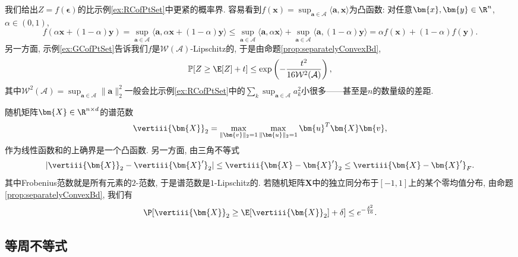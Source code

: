 \begin{example}[点集的Rademacher复杂度']
	我们给出$Z = f(\bm{\epsilon})$的比示例\ref{ex:RCofPtSet}中更紧的概率界. 
	容易看到$f(\bm{x}) = \sup_{\bm{a} \in \mathcal{A}} \langle \bm{a}, \bm{x} \rangle$为凸函数: 对任意$\bm{x}, \bm{y} \in \R^n$, $\alpha \in (0,1)$, 
	\begin{equation*}
		f(\alpha \bm{x} + (1-\alpha) \bm{y})
		= \sup_{\bm{a} \in \mathcal{A}} \langle \bm{a}, \alpha \bm{x} + (1-\alpha) \bm{y} \rangle
		\leq \sup_{\bm{a} \in \mathcal{A}} \langle \bm{a}, \alpha \bm{x} \rangle + \sup_{\bm{a} \in \mathcal{A}} \langle \bm{a}, (1-\alpha) \bm{y} \rangle
		= \alpha f(\bm{x}) + (1-\alpha) f(\bm{y}).  
	\end{equation*}
	另一方面, 示例\ref{ex:GCofPtSet}告诉我们$f$是$\mathcal{W}(\mathcal{A})$-Lipschitz的, 于是由命题\ref{prop:separatelyConvexBd}, 
	\begin{equation*}
		\mathbb{P}[Z \geq \E[Z] + t] \leq \exp \left( - \frac{t^2}{16\mathcal{W}^2(\mathcal{A})} \right), 
	\end{equation*}
	其中$\mathcal{W}^2(\mathcal{A}) = \sup_{\bm{a} \in \mathcal{A}}\|\bm{a}\|_2^2$一般会比示例\ref{ex:RCofPtSet}中的$\sum_k \sup_{\bm{a} \in \mathcal{A}} a_k^2$小很多——甚至是$n$的数量级的差距. 
\end{example}

\begin{example}[随机矩阵的谱范数]
	随机矩阵$\bm{X} \in \R^{n \times d}$的谱范数
	\begin{equation*}
		\vertiii{\bm{X}}_2 = \max_{\|\bm{v}\|_2 = 1} \max_{\|\bm{u}\|_2 = 1} \bm{u}^T \bm{X} \bm{v}, 
	\end{equation*}
	作为线性函数和的上确界是一个凸函数. 
	另一方面, 由三角不等式
	\begin{equation*}
		|\vertiii{\bm{X}}_2 - \vertiii{\bm{X}'}_2|
		\leq \vertiii{\bm{X} - \bm{X}'}_2
		\leq \vertiii{\bm{X} - \bm{X}'}_F. 
	\end{equation*}
	其中Frobenius范数就是所有元素的$2$-范数, 于是谱范数是$1$-Lipschitz的. 
	若随机矩阵$\bm{X}$中的独立同分布于$[-1,1]$上的某个零均值分布, 由命题\ref{prop:separatelyConvexBd}, 我们有
	\begin{equation*}
		\P[ \vertiii{\bm{X}}_2 \geq \E[\vertiii{\bm{X}}_2] + \delta]
		\leq e^{-\frac{\delta^2}{16}}. 
	\end{equation*}
\end{example}


\subsection{等周不等式}

